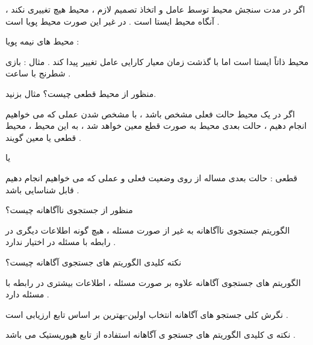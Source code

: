 \documentclass[12pt]{article}
\begin{document}
\begin{tcolorbox}
\noindent
اگر در مدت سنجش محیط توسط عامل و اتخاذ تصمیم لازم ، محیط هیچ تغییری نکند ، آنگاه محیط ایستا است . در غیر این صورت محیط پویا است .

\noindent
محیط های نیمه پویا :

\noindent
محیط ذاتاً ایستا است اما با گذشت زمان معیار کارایی عامل تغییر پیدا کند . مثال : بازی شطرنج با ساعت .
\end{tcolorbox}


\vspace{20pt}
\noindent
منظور از محیط قطعی چیست؟ مثال بزنید.


\begin{tcolorbox}
\noindent
اگر در یک محیط حالت فعلی مشخص باشد ، با مشخص شدن عملی که می خواهیم انجام دهیم ، حالت بعدی محیط به صورت قطع معین خواهد شد ، به این محیط ، محیط قطعی یا معین گویند .

\vspace{20pt}
یا
\vspace{20pt}

\noindent
قطعی
 :
	حالت بعدی مساله از روی وضعیت فعلی و عملی که می خواهیم انجام دهیم قابل شناسایی باشد .
	
\end{tcolorbox}





\newpage
\vspace{20pt}
\noindent
منظور از جستجوی ناآگاهانه چیست؟




\begin{tcolorbox}
الگوریتم جستجوی ناآگاهانه به غیر از صورت مسئله ، هیچ گونه اطلاعات دیگری در رابطه با مسئله در اختیار ندارد .
\end{tcolorbox}


\vspace{20pt}
\noindent
نکته کلیدی الگوریتم های جستجوی آگاهانه چیست؟




\begin{tcolorbox}
الگوریتم های جستجوی آگاهانه علاوه بر صورت مسئله ، اطلاعات بیشتری در رابطه با مسئله دارد .


نگرش کلی جستجو های آگاهانه انتخاب اولین-بهترین 
بر اساس تابع ارزیابی است .
\end{tcolorbox}


\begin{tcolorbox}
نکته ی کلیدی الگوریتم های جستجو ی آگاهانه استفاده از تابع هیوریستیک می باشد .
\end{tcolorbox}
\end{document}
